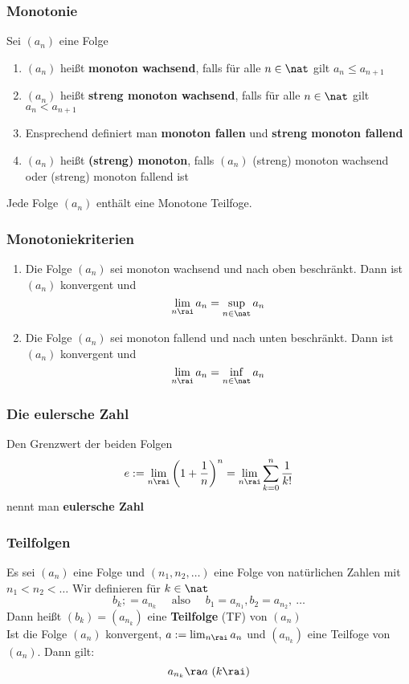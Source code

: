 \documentclass{kit}
\begin{document}
    \subsubsection{Monotonie}
      Sei $(a_n)$ eine Folge
      \begin{enumerate}
        \item $(a_n)$ heißt \textbf{monoton wachsend}, falls für alle $n\in\nat$ gilt $a_n\le a_{n+1}$
        \item $(a_n)$ heißt \textbf{streng monoton wachsend}, falls für alle $n\in\nat$ gilt $a_n<a_{n+1}$
        \item Ensprechend definiert man \textbf{monoton fallen} und \textbf{streng monoton fallend}
        \item $(a_n)$ heißt \textbf{(streng) monoton}, falls $(a_n)$ (streng) monoton wachsend oder (streng) monoton fallend ist
      \end{enumerate}
      Jede Folge $(a_n)$ enthält eine Monotone Teilfoge.
    \subsubsection{Monotoniekriterien}
      \begin{enumerate}
        \item Die Folge $(a_n)$ sei monoton wachsend und nach oben beschränkt. Dann ist $(a_n)$ konvergent und
          $$\lim_{n\rai}a_n=\sup_{n\in\nat}a_n$$
        \item Die Folge $(a_n)$ sei monoton fallend und nach unten beschränkt. Dann ist $(a_n)$ konvergent und
          $$\lim_{n\rai}a_n=\inf_{n\in\nat}a_n$$
      \end{enumerate}
    \subsubsection{Die eulersche Zahl}
      Den Grenzwert der beiden Folgen
      $$e:=\lim_{n\rai}\left(1+\frac{1}{n}\right)^n=\lim_{n\rai}\sum^n_{k=0}\frac{1}{k!}$$
      nennt man \textbf{eulersche Zahl}
    \subsubsection{Teilfolgen}
      Es sei $(a_n)$ eine Folge und $(n_1,n_2,\dots)$ eine Folge von natürlichen Zahlen mit $n_1<n_2<\dots$ Wir definieren für $k\in\nat$
      $$b_k;=a_{n_k}\quad \text{ also }\quad b_1=a_{n_1}, b_2=a_{n_2},\ \dots$$
      Dann heißt $(b_k)=(a_{n_k})$ eine \textbf{Teilfolge} (TF) von $(a_n)$\\
      Ist die Folge $(a_n)$ konvergent, $a:=\lim_{n\rai}a_n$ und $(a_{n_k})$ eine Teilfoge von $(a_n)$. Dann gilt:
      $$a_{n_k}\ra a\ (k\rai)$$
\end{document}
